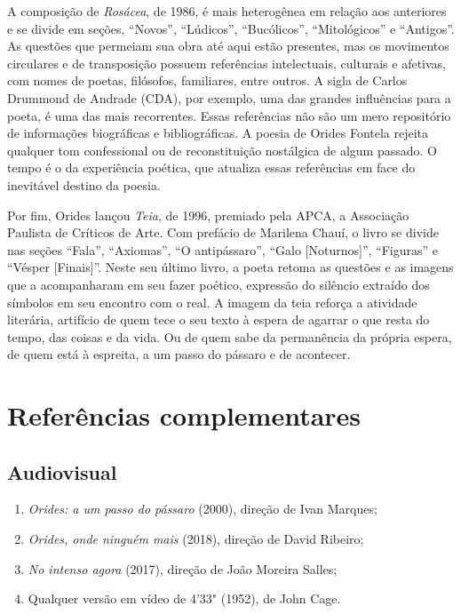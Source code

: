 \documentclass[12pt]{extarticle}
\begin{document}
A composição de \emph{Rosácea}, de 1986, é mais heterogênea em relação
aos anteriores e se divide em seções, ``Novos'', ``Lúdicos'',
``Bucólicos'', ``Mitológicos'' e ``Antigos''. As questões que permeiam
sua obra até aqui estão presentes, mas os movimentos circulares e de
transposição possuem referências intelectuais, culturais e afetivas, com
nomes de poetas, filósofos, familiares, entre outros. A sigla de Carlos
Drummond de Andrade (CDA), por exemplo, uma das grandes influências para
a poeta, é uma das mais recorrentes. Essas referências não são um mero
repositório de informações biográficas e bibliográficas. A poesia de
Orides Fontela rejeita qualquer tom confessional ou de reconstituição
nostálgica de algum passado. O tempo é o da experiência poética, que
atualiza essas referências em face do inevitável destino da poesia.






Por fim, Orides lançou \emph{Teia}, de 1996, premiado pela APCA, a
Associação Paulista de Críticos de Arte. Com prefácio de Marilena Chauí,
o livro se divide nas seções ``Fala'', ``Axiomas'', ``O antipássaro'',
``Galo {[}Noturnos{]}'', ``Figuras'' e ``Vésper {[}Finais{]}''. Neste
seu último livro, a poeta retoma as questões e as imagens que a
acompanharam em seu fazer poético, expressão do silêncio extraído dos
símbolos em seu encontro com o real. A imagem da teia reforça a
atividade literária, artifício de quem tece o seu texto à espera de
agarrar o que resta do tempo, das coisas e da vida. Ou de quem sabe da
permanência da própria espera, de quem está à espreita, a um passo do
pássaro e de acontecer.




\section{Referências complementares}

\subsection{Audiovisual}

\begin{enumerate}
\item
  \emph{Orides: a um passo do pássaro} (2000), direção de Ivan Marques;
\item
  \emph{Orides, onde ninguém mais} (2018), direção de David Ribeiro;
\item
  \emph{No intenso agora} (2017), direção de João Moreira Salles;
\item
  Qualquer versão em vídeo de 4'33" (1952), de John Cage.
\end{enumerate}
\end{document}
